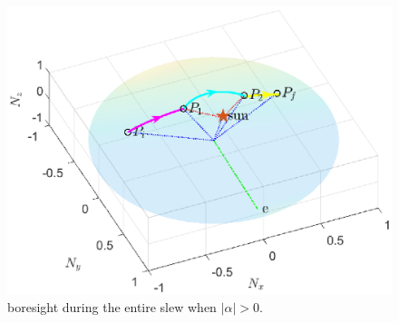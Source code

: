 \documentclass[letterpaper, paper,12pt]{AAS}		%
\begin{document}
	\begin{figure}[!ht]
	\begin{center}
		\includegraphics[width=4.75in]{figures/alphaNot0/phi1_phi2_phi3.eps}
		\caption{boresight during the entire slew when $|\alpha|>0$.}
		\label{fig:phi1_phi2_phi3}
	\end{center}		
\end{figure}	
\end{document}
